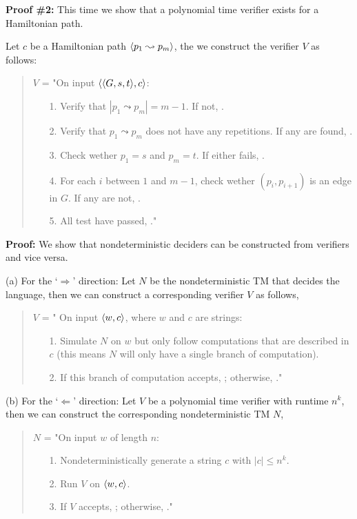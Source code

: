 \documentclass[a4paper,blends,pdf,colorBG,slideColor]{prosper}
\begin{document}
{\small
{}

{\bf Proof \#2:}  This time we show that a polynomial time verifier exists for 
a Hamiltonian path.

Let $c$ be a Hamiltonian path $\langle {p_1 \leadsto p_m} \rangle$, the we construct
the verifier $V$ as follows:

\begin{quote}
$V$ = "On input $\langle {\ensuremath{\langle {G,s,t} \rangle},c} \rangle$:
\begin{itemize}
\item[1.] Verify that $|p_1 \leadsto p_m| = m - 1$.  If not, \reject.
\item[2.] Verify that $p_1 \leadsto p_m$ does not have any repetitions.  If any are found,
\reject.
\item[3.] Check wether $p_1 = s$ and $p_m = t$.  If either fails, \reject.
\item[4.] For each $i$ between $1$ and $m-1$, check wether  $(p_i, p_{i+1})$
 is an edge in $G$. If any are not, \reject. 
\item[5.] All test have passed, \accept."
\end{itemize}
\end{quote}
}
\es

{\small
{}

{\bf Proof:} We show that nondeterministic deciders can be constructed from verifiers and vice versa.

(a) For the `$\Rightarrow$' direction: Let $N$ be the nondeterministic TM that decides the language, then we can construct a corresponding verifier $V$ as follows,
\begin{quote}
$V$ = " On input $\langle {w,c} \rangle$, where $w$ and $c$ are strings:
\begin{itemize}
\item[1.] Simulate $N$ on $w$ but only follow computations that are described in $c$
(this means $N$ will only have a single branch of computation).
\item[2.] If this branch of computation accepts, \accept; otherwise, \reject."
\end{itemize}
\end{quote}

(b) For the `$\Leftarrow$' direction: Let $V$ be a polynomial time verifier with runtime $n^k$, then we can construct
the corresponding nondeterministic TM $N$,
\begin{quote}
$N$  = "On input $w$ of length $n$:
\begin{itemize}
\item[1.] Nondeterministically generate a string $c$ with $|c| \le n^k$.
\item[2.] Run $V$ on $\langle {w,c} \rangle$.
\item[3.] If $V$ accepts, \accept; otherwise, \reject."
\end{itemize}
\end{quote}
}
\es
\end{document}
